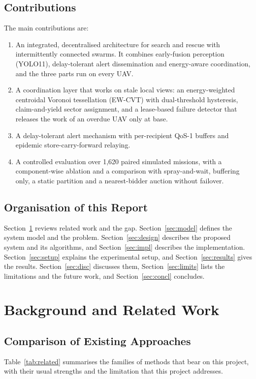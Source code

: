 \documentclass[10pt,letterpaper]{article}
\begin{document}
\subsection{Contributions}
The main contributions are:
\begin{enumerate}
\item An integrated, decentralised architecture for search and rescue with intermittently connected swarms. It combines early-fusion perception (YOLO11), delay-tolerant alert dissemination and energy-aware coordination, and the three parts run on every UAV.
\item A coordination layer that works on stale local views: an energy-weighted centroidal Voronoi tessellation (EW-CVT) with dual-threshold hysteresis, claim-and-yield sector assignment, and a lease-based failure detector that releases the work of an overdue UAV only at base.
\item A delay-tolerant alert mechanism with per-recipient QoS-1 buffers and epidemic store-carry-forward relaying.
\item A controlled evaluation over 1,620 paired simulated missions, with a component-wise ablation and a comparison with spray-and-wait, buffering only, a static partition and a nearest-bidder auction without failover.
\end{enumerate}

\subsection{Organisation of this Report}
Section~\ref{sec:related} reviews related work and the gap. Section~\ref{sec:model} defines the system model and the problem. Section~\ref{sec:design} describes the proposed system and its algorithms, and Section~\ref{sec:impl} describes the implementation. Section~\ref{sec:setup} explains the experimental setup, and Section~\ref{sec:results} gives the results. Section~\ref{sec:disc} discusses them, Section~\ref{sec:limits} lists the limitations and the future work, and Section~\ref{sec:concl} concludes.

\section{Background and Related Work}\label{sec:related}
\subsection{Comparison of Existing Approaches}
Table~\ref{tab:related} summarises the families of methods that bear on this project, with their usual strengths and the limitation that this project addresses.
\end{document}
